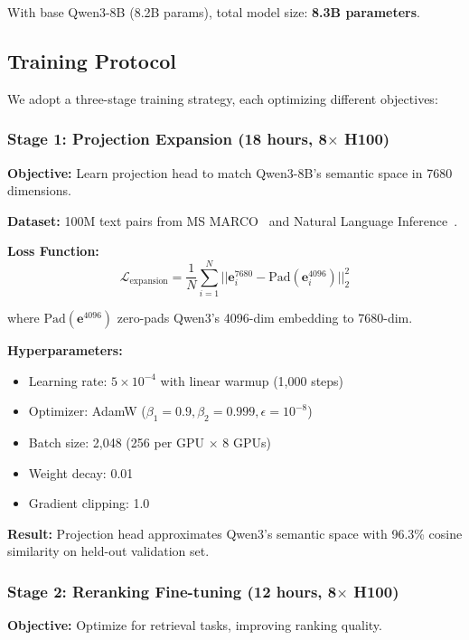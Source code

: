 With base Qwen3-8B (8.2B params), total model size: \textbf{8.3B parameters}.

\subsection{Training Protocol}

We adopt a three-stage training strategy, each optimizing different objectives:

\subsubsection{Stage 1: Projection Expansion (18 hours, 8$\times$ H100)}

\textbf{Objective:} Learn projection head to match Qwen3-8B's semantic space in 7680 dimensions.

\textbf{Dataset:} 100M text pairs from MS MARCO~\cite{nguyen2016msmarco} and Natural Language Inference~\cite{bowman2015snli}.

\textbf{Loss Function:}
\begin{equation}
\mathcal{L}_{\text{expansion}} = \frac{1}{N} \sum_{i=1}^{N} ||\mathbf{e}_i^{7680} - \text{Pad}(\mathbf{e}_i^{4096})||_2^2
\end{equation}

where $\text{Pad}(\mathbf{e}^{4096})$ zero-pads Qwen3's 4096-dim embedding to 7680-dim.

\textbf{Hyperparameters:}
\begin{itemize}
\item Learning rate: $5 \times 10^{-4}$ with linear warmup (1,000 steps)
\item Optimizer: AdamW ($\beta_1=0.9, \beta_2=0.999, \epsilon=10^{-8}$)
\item Batch size: 2,048 (256 per GPU $\times$ 8 GPUs)
\item Weight decay: 0.01
\item Gradient clipping: 1.0
\end{itemize}

\textbf{Result:} Projection head approximates Qwen3's semantic space with 96.3\% cosine similarity on held-out validation set.

\subsubsection{Stage 2: Reranking Fine-tuning (12 hours, 8$\times$ H100)}

\textbf{Objective:} Optimize for retrieval tasks, improving ranking quality.

